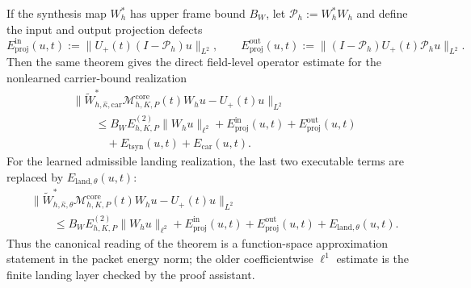 \begin{theorem}
\[\]
If the synthesis map $W_h^\ast$ has upper frame bound $B_W$, let $\mathcal P_h:=W_h^\ast W_h$ and define the input and output projection defects
\[
E_{\mathrm{proj}}^{\mathrm{in}}(u,t)
:=
\|U_+(t)(I-\mathcal P_h)u\|_{L^2},
\qquad
E_{\mathrm{proj}}^{\mathrm{out}}(u,t)
:=
\|(I-\mathcal P_h)U_+(t)\mathcal P_hu\|_{L^2}.
\]
Then the same theorem gives the direct field-level operator estimate for the nonlearned carrier-bound realization
\[
\begin{aligned}
&\|\widetilde W_{h,\widehat\kappa,\mathrm{car}}^{\ast}
\mathcal M_{h,K,P}^{\mathrm{core}}(t)W_hu
-U_+(t)u\|_{L^2} \\
&\qquad \le
B_W E_{h,K,P}^{(2)}\|W_hu\|_{\ell^2}
+E_{\mathrm{proj}}^{\mathrm{in}}(u,t)
+E_{\mathrm{proj}}^{\mathrm{out}}(u,t) \\
&\qquad\quad
+E_{\mathrm{tsyn}}(u,t)
+E_{\mathrm{car}}(u,t).
\end{aligned}
\]
For the learned admissible landing realization, the last two executable terms are replaced by $E_{\mathrm{land},\theta}(u,t)$:
\[
\begin{aligned}
&\|\widetilde W_{h,\widehat\kappa,\theta}^{\ast}
\mathcal M_{h,K,P}^{\mathrm{core}}(t)W_hu
-U_+(t)u\|_{L^2} \\
&\qquad \le
B_W E_{h,K,P}^{(2)}\|W_hu\|_{\ell^2}
+E_{\mathrm{proj}}^{\mathrm{in}}(u,t)
+E_{\mathrm{proj}}^{\mathrm{out}}(u,t)
+E_{\mathrm{land},\theta}(u,t).
\end{aligned}
\]
Thus the canonical reading of the theorem is a function-space approximation statement in the packet energy norm; the older coefficientwise $\ell^1$ estimate is the finite landing layer checked by the proof assistant.
\end{theorem}

